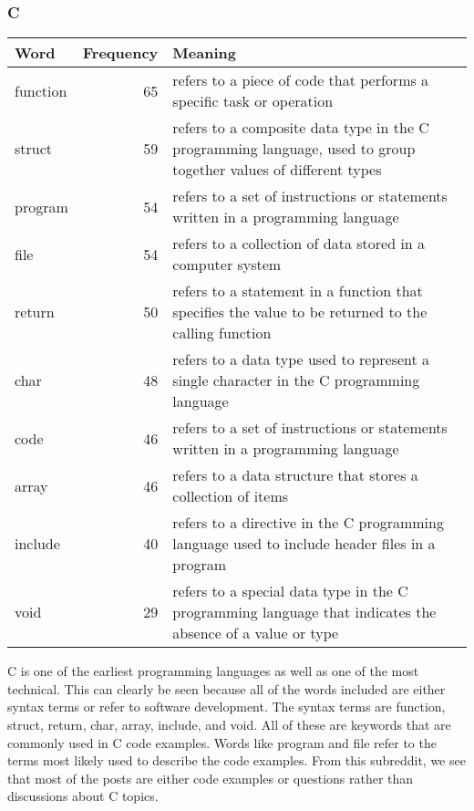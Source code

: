 \documentclass{article}
\theoremstyle{theorem}
\theoremstyle{definition}
\theoremstyle{remark}
\begin{document}
\subsubsection{C}
\begin{tabular}{ | l | r | p{7cm} | }
\hline
Word & Frequency & Meaning \\
\hline
function & 65 & refers to a piece of code that performs a specific task or operation \\
\hline
struct & 59 & refers to a composite data type in the C programming language, used to group together values of different types \\
\hline
program & 54 & refers to a set of instructions or statements written in a programming language \\
\hline
file & 54 & refers to a collection of data stored in a computer system \\
\hline
return & 50 & refers to a statement in a function that specifies the value to be returned to the calling function \\
\hline
char & 48 & refers to a data type used to represent a single character in the C programming language \\
\hline
code & 46 & refers to a set of instructions or statements written in a programming language \\
\hline
array & 46 & refers to a data structure that stores a collection of items \\
\hline
include & 40 & refers to a directive in the C programming language used to include header files in a program \\
\hline
void & 29 & refers to a special data type in the C programming language that indicates the absence of a value or type \\
\hline
\end{tabular}

\medskip
C is one of the earliest programming languages as well as one of the most technical. This can clearly be seen because all of the words included are either syntax terms or refer to software development. The syntax terms are function, struct, return, char, array, include, and void. All of these are keywords that are commonly used in C code examples. Words like program and file refer to the terms most likely used to describe the code examples. From this subreddit, we see that most of the posts are either code examples or questions rather than discussions about C topics.
\end{document}
